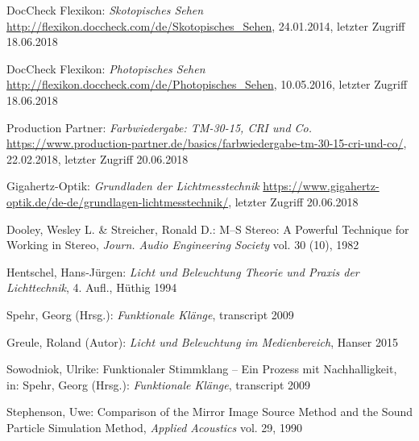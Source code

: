 \begin{thebibliography}{}


DocCheck Flexikon:
\emph{\glqq Skotopisches Sehen \glqq}
\url{http://flexikon.doccheck.com/de/Skotopisches_Sehen}, 24.01.2014, letzter Zugriff 18.06.2018

DocCheck Flexikon:
\emph{\glqq Photopisches Sehen \glqq}
\url{http://flexikon.doccheck.com/de/Photopisches_Sehen}, 10.05.2016, letzter Zugriff 18.06.2018

Production Partner:
\emph{\glqq Farbwiedergabe: TM-30-15, CRI und Co.\glqq}
\url{https://www.production-partner.de/basics/farbwiedergabe-tm-30-15-cri-und-co/}, 22.02.2018, letzter Zugriff 20.06.2018


Gigahertz-Optik:
\emph{\glqq Grundladen der Lichtmesstechnik\grqq}
\url{https://www.gigahertz-optik.de/de-de/grundlagen-lichtmesstechnik/}, letzter Zugriff 20.06.2018


Dooley, Wesley L.  \& Streicher, Ronald D.:
\glqq M--S Stereo: A Powerful Technique for Working in Stereo\grqq, 
\emph{Journ. Audio Engineering Society} vol. 30 (10), 1982


Hentschel, Hans-Jürgen: 
\emph{Licht und Beleuchtung Theorie und Praxis der Lichttechnik}, 4. Aufl., Hüthig 1994

Spehr, Georg (Hrsg.): 
\emph{Funktionale Klänge}, transcript 2009

Greule, Roland (Autor):
\emph{Licht und Beleuchtung im Medienbereich}, Hanser 2015 


Sowodniok, Ulrike: 
\glqq Funktionaler Stimmklang -- Ein Prozess mit Nachhalligkeit\grqq, 
in: Spehr, Georg (Hrsg.): \emph{Funktionale Klänge}, transcript 2009




Stephenson, Uwe: 
\glqq Comparison of the Mirror Image Source Method and the Sound Particle Simulation Method\grqq, 
\emph{Applied Acoustics} vol. 29, 1990


\end{thebibliography}

